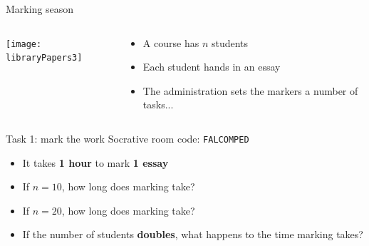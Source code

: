 \begin{frame}{Marking season}
	\begin{columns}
		\begin{column}{0.47\textwidth}
			\texttt{[image: libraryPapers3]} \pause
		\end{column}
		\begin{column}{0.47\textwidth}
			\begin{itemize}
				\item A course has $n$ students \pause
				\item Each student hands in an essay \pause
				\item The administration sets the markers a number of tasks...
			\end{itemize}
		\end{column}
	\end{columns}
\end{frame}

\begin{frame}{Task 1: mark the work}
	Socrative room code: \texttt{FALCOMPED}
	\begin{itemize}
		\item It takes \textbf{1 hour} to mark \textbf{1 essay} \pause
		\item If $n=10$, how long does marking take? \pause
		\item If $n=20$, how long does marking take? \pause
		\item If the number of students \textbf{doubles}, what happens to the time marking takes?
	\end{itemize}
\end{frame}


